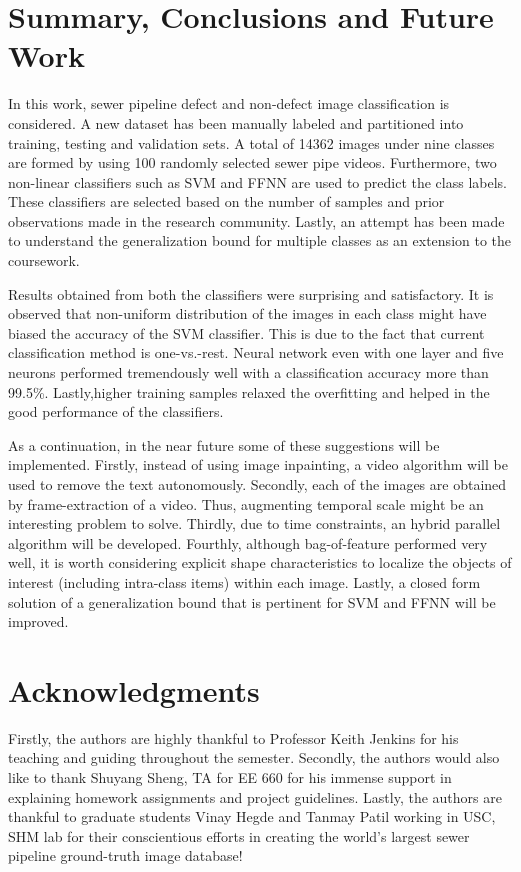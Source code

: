 \documentclass[letterpaper,12pt, onecolumn]{article}%
\begin{document}
\section{Summary, Conclusions and Future Work} \label{sec:summary_conclusion}
\noindent
In this work, sewer pipeline defect and non-defect image classification is considered. A new dataset has been manually labeled and partitioned into training, testing and validation sets. A total of 14362 images under nine classes are formed by using 100 randomly selected sewer pipe videos. Furthermore, two non-linear classifiers such as SVM and FFNN are used to predict the class labels. These classifiers are selected based on the number of samples and prior observations made in the research community. Lastly, an attempt has been made to understand the generalization bound for multiple classes as an extension to the coursework.    

Results obtained from both the classifiers were surprising and satisfactory. It is observed that non-uniform distribution of the images in each class might have biased the accuracy of the SVM classifier. This is due to the fact that current classification method is one-vs.-rest. Neural network even with one layer and five neurons performed tremendously well with a classification accuracy more than 99.5\%. Lastly,higher training samples relaxed the overfitting and helped in the good performance of the classifiers.  

As a continuation, in the near future some of these suggestions will be implemented. Firstly, instead of using image inpainting, a video algorithm will be used to remove the text autonomously. Secondly, each of the  images are obtained by frame-extraction of a video. Thus, augmenting temporal scale might be an interesting problem to solve. Thirdly, due to time constraints, an hybrid parallel algorithm will be developed. Fourthly, although bag-of-feature performed very well, it is worth considering explicit shape characteristics to localize the objects of interest (including intra-class items) within each image. Lastly, a closed form solution of a generalization bound that is pertinent for SVM and FFNN will be improved.

\section{Acknowledgments} 
\noindent
Firstly, the authors are highly thankful to Professor Keith Jenkins for his teaching and guiding throughout the semester. Secondly, the authors would also like to thank Shuyang Sheng, TA for EE 660 for his immense support in explaining homework assignments and project guidelines. Lastly, the authors are thankful to graduate students Vinay Hegde and Tanmay Patil working in USC, SHM lab for their conscientious efforts in creating the world's largest sewer pipeline ground-truth image database!
\end{document}
